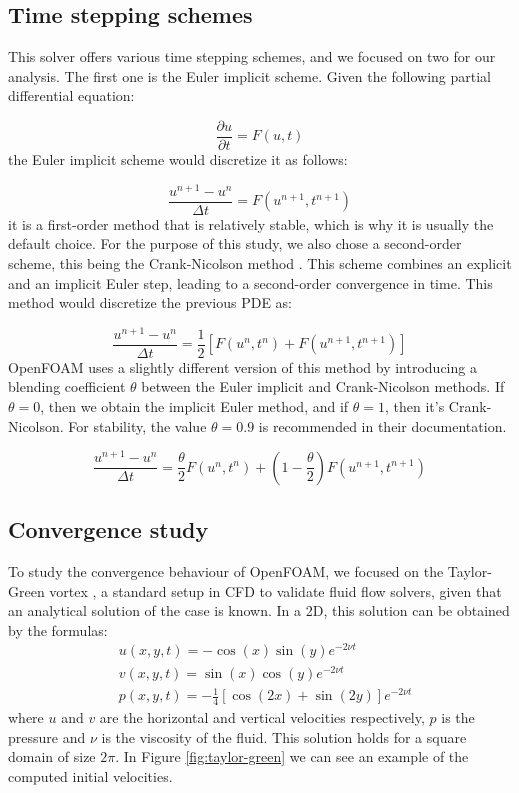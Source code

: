 \documentclass[
  english,        %
  font=times,     %
  onecolumn,      %
]{tumarticle}
\begin{document}
\subsection{Time stepping schemes}\label{sec:euler}
This solver offers various time stepping schemes, and we focused on two for our analysis. The first one is the Euler implicit scheme. Given the following partial differential equation:

\begin{equation}
    \frac{\partial u}{\partial t} = F(u, t)
\end{equation}
the Euler implicit scheme would discretize it as follows:

\begin{equation}
    \frac{u^{n+1} - u^n}{\Delta t} = {F}(u^{n+1}, t^{n+1})
\end{equation}
it is a first-order method that is relatively stable, which is why it is usually the default choice. For the purpose of this study, we also chose a second-order scheme, this being the Crank-Nicolson method \cite{crank1947practical}. This scheme combines an explicit and an implicit Euler step, leading to a second-order convergence in time. This method would discretize the previous PDE as: 

\begin{equation}
    \frac{u^{n+1} - u^n}{\Delta t} = \frac{1}{2} \left[F(u^n, t^n) +  F(u^{n+1}, t^{n+1}) \right]
\end{equation}
OpenFOAM uses a slightly different version of this method by introducing a blending coefficient $\theta$ between the Euler implicit and Crank-Nicolson methods. If $\theta = 0$, then we obtain the implicit Euler method, and if $\theta = 1$, then it's Crank-Nicolson. For stability, the value $\theta = 0.9$ is recommended in their documentation.

\begin{equation}
    \frac{u^{n+1} - u^n}{\Delta t} = \frac{\theta}{2} F(u^{n}, t^{n}) + \left( 1 - \frac{\theta}{2} \right) F(u^{n+1}, t^{n+1})
\end{equation}


\subsection{Convergence study}

To study the convergence behaviour of OpenFOAM, we focused on the Taylor-Green vortex \cite{taylor1937mechanism, chorin1968numerical}, a standard setup in CFD to validate fluid flow solvers, given that an analytical solution of the case is known. In a 2D, this solution can be obtained by the formulas:
\begin{align}
    &u(x, y, t) = -\cos(x) \sin(y) e^{-2\nu t} \\
    &v(x, y, t) = \sin(x) \cos(y) e^{-2\nu t} \\
    &p(x, y, t) = -\frac{1}{4}\left[\cos(2x) + \sin(2y)\right]e^{-2\nu t}
\end{align}
where $u$ and $v$ are the horizontal and vertical velocities respectively, $p$ is the pressure and $\nu$ is the viscosity of the fluid. This solution holds for a square domain of size $2\pi$. In Figure \ref{fig:taylor-green} we can see an example of the computed initial velocities. 
\end{document}
